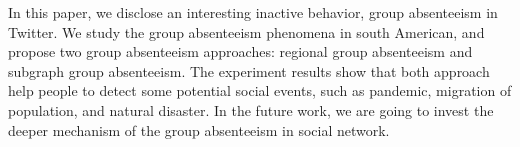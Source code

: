 In this paper, we disclose an interesting inactive behavior, group absenteeism in Twitter. We study the group absenteeism phenomena in south American, and propose two group absenteeism approaches: regional group absenteeism and subgraph group absenteeism. The experiment results show that both approach help people to detect some potential social events, such as pandemic, migration of population, and natural disaster. In the future work, we are going to invest the deeper mechanism of the group absenteeism in social network.
